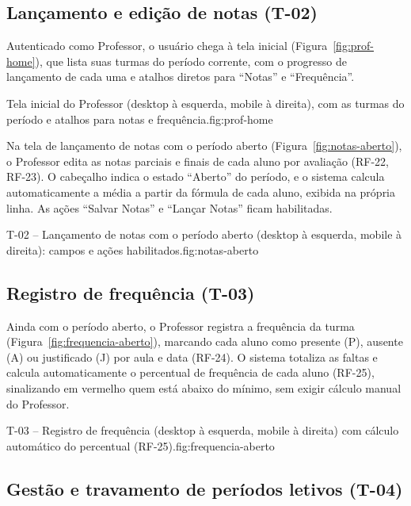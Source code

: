 \subsection{Lançamento e edição de notas (T-02)}

Autenticado como Professor, o usuário chega à tela inicial
(Figura~\ref{fig:prof-home}), que lista suas turmas do período corrente, com o
progresso de lançamento de cada uma e atalhos diretos para ``Notas'' e
``Frequência''.

%
{Tela inicial do Professor (desktop à esquerda, mobile à direita), com as turmas do período e atalhos para notas e frequência.}{fig:prof-home}

Na tela de lançamento de notas com o período aberto
(Figura~\ref{fig:notas-aberto}), o Professor edita as notas parciais e finais de
cada aluno por avaliação (RF-22, RF-23). O cabeçalho indica o estado ``Aberto''
do período, e o sistema calcula automaticamente a média a partir da fórmula de
cada aluno, exibida na própria linha. As ações ``Salvar Notas'' e ``Lançar
Notas'' ficam habilitadas.

%
{T-02 -- Lançamento de notas com o período aberto (desktop à esquerda, mobile à direita): campos e ações habilitados.}{fig:notas-aberto}

\subsection{Registro de frequência (T-03)}

Ainda com o período aberto, o Professor registra a frequência da turma
(Figura~\ref{fig:frequencia-aberto}), marcando cada aluno como presente (P),
ausente (A) ou justificado (J) por aula e data (RF-24). O sistema totaliza as
faltas e calcula automaticamente o percentual de frequência de cada aluno
(RF-25), sinalizando em vermelho quem está abaixo do mínimo, sem exigir cálculo
manual do Professor.

%
{T-03 -- Registro de frequência (desktop à esquerda, mobile à direita) com cálculo automático do percentual (RF-25).}{fig:frequencia-aberto}

\subsection{Gestão e travamento de períodos letivos (T-04)}

